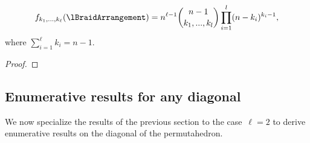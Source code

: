 \begin{theorem}
\label{thm:verticesRefinedlnBraidArrangement}
\begin{equation}
f_{k_1, \ldots, k_\ell}(\lBraidArrangement) = n^{\ell-1}  \binom{n-1}{k_1, ..., k_l} \prod_{i=1}^l (n-k_i)^{k_i-1}, 
\end{equation}
where $\sum_{i=1}^\ell k_i = n-1$.
\end{theorem}

\begin{proof}
\end{proof}

\subsection{Enumerative results for any diagonal} 
\label{s:facets}

We now specialize the results of the previous section to the case~$\ell = 2$ to derive enumerative results on the diagonal of the permutahedron.

